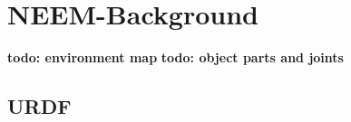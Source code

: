 
\chapter{NEEM-Background}
\label{ch:background}

\textbf{todo: environment map}
\textbf{todo: object parts and joints}

\section{URDF}

